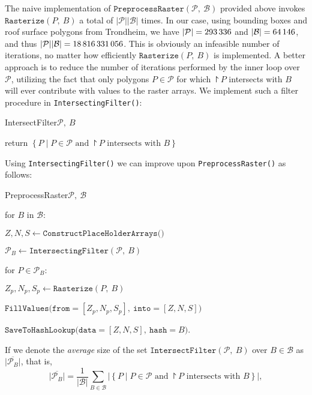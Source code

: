The naive implementation of $\texttt{PreprocessRaster}(\mathcal{P},~\mathcal{B})$ provided above invokes $\texttt{Rasterize}(P,~B)$ a total of $|\mathcal{P}| |\mathcal{B}|$ times.
In our case, using bounding boxes and roof surface polygons from Trondheim, we have $|\mathcal{P}| = \num{293336}$ and $|\mathcal{B}| = \num{64146}$, and thus $|\mathcal{P}||\mathcal{B}| = \num{18816331056}$.
This is obviously an infeasible number of iterations, no matter how efficiently $\texttt{Rasterize}(P,~B)$ is implemented.
A better approach is to reduce the number of iterations performed by the inner loop over $\mathcal{P}$, utilizing the fact that only polygons $P \in \mathcal{P}$ for which $\project{P}$ intersects with $B$ will ever contribute with values to the raster arrays.
We implement such a filter procedure in \texttt{IntersectingFilter()}:
%
\begin{pseudofunc}{IntersectFilter}{$\mathcal{P},~B$}
  \item return $\left\{P \mid P \in \mathcal{P} \text{ and } \project{P} \text{ intersects with } B \right\}$
\end{pseudofunc}
%
Using \texttt{IntersectingFilter()} we can improve upon \texttt{PreprocessRaster()} as follows:
%
\begin{pseudofunc}{PreprocessRaster}{$\mathcal{P},~\mathcal{B}$}
  \item for $B$ in $\mathcal{B}$:
  \begin{pseudoloop}
    \item $Z, N, S \leftarrow \texttt{ConstructPlaceHolderArrays()}$
    \item $\mathcal{P}_B \leftarrow \texttt{IntersectingFilter}(\mathcal{P},~B)$
    \item for $P \in \mathcal{P}_B$:
    \begin{pseudoloop}
      \item $Z_p, N_p, S_p \leftarrow \texttt{Rasterize}(P,~B)$
      \item $\texttt{FillValues(from}=[Z_p, N_p, S_p],~\texttt{into}=[Z, N, S])$
    \end{pseudoloop}
    \item $\texttt{SaveToHashLookup(data}=[Z, N, S],~\texttt{hash}=B)$.
  \end{pseudoloop}
\end{pseudofunc}
%
If we denote the \textit{average} size of the set $\texttt{IntersectFilter}(\mathcal{P},~B)$ over $B \in \mathcal{B}$ as $\overline{|\mathcal{P}_B|}$, that is,
%
\begin{equation*}
  \overline{|\mathcal{P}_B|}
  =
  \frac{1}{|\mathcal{B}|}
  \sum_{B \in \mathcal{B}}
  \big|
    \left\{P \mid P \in \mathcal{P} \text{ and } \project{P} \text{ intersects with } B \right\}
  \big|,
\end{equation*}
